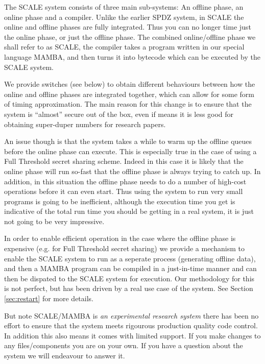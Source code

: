 

\label{sec:introduction}
The SCALE system consists of three main sub-systems:
An offline phase, an online phase and a compiler. 
Unlike the earlier SPDZ system, in SCALE the online
and offline phases are fully integrated. Thus you
can no longer time just the online phase, or just
the offline phase.
The combined online/offline phase we shall refer
to as SCALE, the compiler takes a program written
in our special language MAMBA, and then turns it
into bytecode which can be executed by the SCALE
system. 

We provide switches (see below) to obtain 
different behaviours between how the online and offline
phases are integrated together, which can allow for
some form of timing approximation.
The main reason for this change is to ensure that the
system is ``almost'' secure out of the box, even if
means it is less good for obtaining super-duper numbers
for research papers.

An issue though is that the system takes a while to warm
up the offline queues before the online phase can execute.
This is especially true in the case of using a Full Threshold
secret sharing scheme. Indeed in this case it is likely
that the online phase will run so-fast that the offline
phase is always trying to catch up. In addition, in this
situation the offline phase needs to do a number of
high-cost operations before it can even start. Thus
using the system to run very small programs is going to
be inefficient, although the execution time you get
is indicative of the total run time you should be getting
in a real system, it is just not going to be very
impressive.

In order to enable efficient operation in the case where the
offline phase is expensive (e.g. for Full Threshold secret sharing)
we provide a mechanism to enable the SCALE system to run
as a seperate process (generating offline data), and then
a MAMBA program can be compiled in a just-in-time manner
and can then be dispated to the SCALE system for
execution. Our methodology for this is not perfect, but has
been driven by a real use case of the system.
See Section \ref{sec:restart} for more details.

But note SCALE/MAMBA is {\em an experimental research system} 
there has been no effort to ensure that the system meets rigourous production
quality code control. 
In addition this also means it comes with limited support.
If you make changes to any files/components you are on your
own.
If you have a question about the system we will endeavour to
answer it.

